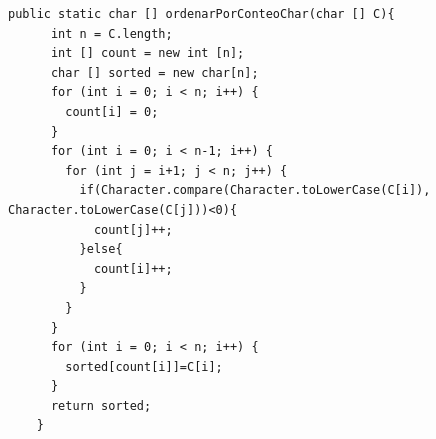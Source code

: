\begin{enumerate}[a)]
  \begin{lstlisting}[style=java,caption= Metodo ordenarPorConteoChar]
    public static char [] ordenarPorConteoChar(char [] C){
      int n = C.length;
      int [] count = new int [n];
      char [] sorted = new char[n];
      for (int i = 0; i < n; i++) {
        count[i] = 0;
      }
      for (int i = 0; i < n-1; i++) {
        for (int j = i+1; j < n; j++) {
          if(Character.compare(Character.toLowerCase(C[i]), Character.toLowerCase(C[j]))<0){
            count[j]++;
          }else{
            count[i]++;
          }
        }
      }
      for (int i = 0; i < n; i++) {
        sorted[count[i]]=C[i];
      }
      return sorted;
    }
   \end{lstlisting}

\end{enumerate}